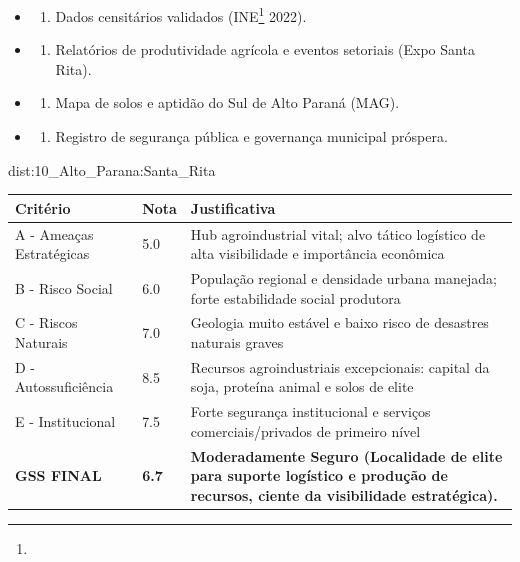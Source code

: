 {\begin{itemize}
\tightlist
\item
  \begin{enumerate}
  \def\labelenumi{\arabic{enumi})}
  \tightlist
  \item
    Dados censitários validados (INE\footnote{\fineINE} 2022).
  \end{enumerate}
\item
  \begin{enumerate}
  \def\labelenumi{\arabic{enumi})}
  \setcounter{enumi}{1}
  \tightlist
  \item
    Relatórios de produtividade agrícola e eventos setoriais (Expo Santa
    Rita).
  \end{enumerate}
\item
  \begin{enumerate}
  \def\labelenumi{\arabic{enumi})}
  \setcounter{enumi}{2}
  \tightlist
  \item
    Mapa de solos e aptidão do Sul de Alto Paraná (MAG).
  \end{enumerate}
\item
  \begin{enumerate}
  \def\labelenumi{\arabic{enumi})}
  \setcounter{enumi}{3}
  \tightlist
  \item
    Registro de segurança pública e governança municipal próspera.
  \end{enumerate}
\end{itemize}}{dist:10_Alto_Parana:Santa_Rita}
\begin{table}[ht!]
\small \begin{tabular}{p{3.0cm}p{0.8cm}p{6.0cm}} \toprule
\textbf{Critério} & \textbf{Nota} & \textbf{Justificativa} \\ \midrule
A - Ameaças Estratégicas & 5.0 & Hub agroindustrial vital; alvo tático logístico de alta visibilidade e importância econômica \\
B - Risco Social & 6.0 & População regional e densidade urbana manejada; forte estabilidade social produtora \\
C - Riscos Naturais & 7.0 & Geologia muito estável e baixo risco de desastres naturais graves \\
D - Autossuficiência & 8.5 & Recursos agroindustriais excepcionais: capital da soja, proteína animal e solos de elite \\
E - Institucional & 7.5 & Forte segurança institucional e serviços comerciais/\allowbreak privados de primeiro nível \\
\midrule \textbf{GSS FINAL} & \textbf{6.7} & \textbf{Moderadamente Seguro (Localidade de elite para suporte logístico e produção de recursos, ciente da visibilidade estratégica).} \\ \bottomrule \end{tabular}
\end{table}
